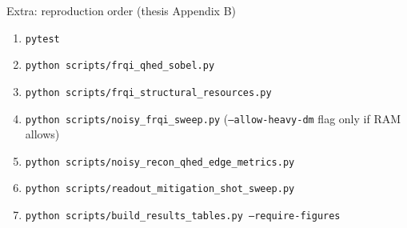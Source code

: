 \documentclass[aspectratio=169,11pt,english]{beamer}
\begin{document}
\begin{frame}{Extra: reproduction order (thesis Appendix B)}
  \small
  \begin{enumerate}
    \item \texttt{pytest}
    \item \texttt{python scripts/frqi\_qhed\_sobel.py}
    \item \texttt{python scripts/frqi\_structural\_resources.py}
    \item \texttt{python scripts/noisy\_frqi\_sweep.py} (\texttt{--allow-heavy-dm} flag only if RAM allows)
    \item \texttt{python scripts/noisy\_recon\_qhed\_edge\_metrics.py}
    \item \texttt{python scripts/readout\_mitigation\_shot\_sweep.py}
    \item \texttt{python scripts/build\_results\_tables.py --require-figures}
  \end{enumerate}
\end{frame}
\end{document}
